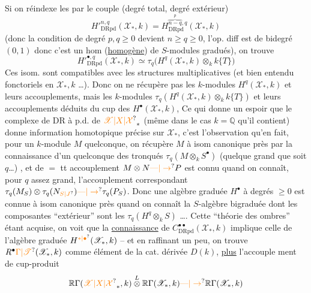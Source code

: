 Si on réindexe les  par le couple (degré total, degré extérieur)
\[
{H'}^{n,q}_{\mathrm{DRpd}}(\mathscr X_{\ast},k)=H^{\overbrace{n-q}^{p},q}_{\mathrm{DRpd}}(\mathscr X_{\ast},k)
\]
(donc la condition de degré $p,q\geq0$ devient $n\geq q\geq 0$, l'op. diff est de bidegré $(0,1)$ donc c'est un hom (\uline{homogène}) de $S$-modules gradués), on trouve
\[
{H'}^{\bullet,q}_{\mathrm{DRpd}}(\mathscr X_\ast,k)\simeq\tau_q\big(H^q(\mathscr X_\ast,k)\otimes_k k\{T\}\big)
\]
Ces isom. sont compatibles avec les structures multiplicatives (et bien entendu fonctoriels en $\mathscr X_{\ast},k$ \ldots). Donc  on ne récupère  pas les $k$-modules $H^q(\mathscr X_{\ast},k)$ et leurs accouplements, mais les $k$-modules  $\tau_q(H^q(\mathscr X_{\ast},k)\otimes_k k\{T\})$ et leurs accouplements déduits du cup des $H^\bullet(\mathscr X_{\ast},k)$,
Ce qui donne un espoir que le complexe de DR à p.d. de $\unsure{\mathscr X|X|\mathcal X}_\ast$  (même dans le cas $k=\mathbb Q$ \unsure{\}|)} qu'il contient) donne  information homotopique précise sur $\mathscr X_\ast$, c'est l'observation qu'en fait, pour un  $k$-module $M$ quelconque, on récupère $M$ à isom canonique près par la connaissance d'un quelconque des tronqués $\tau_q(M\otimes_k S^\bullet)$ (quelque grand que soit $q$\ldots) , et de $=$ tt accouplement $M\otimes N\unsure{\text{---}|\to}P$ est connu quand on connaît, pour $q$ assez grand, l'accouplement correspondant $\tau_q(M_S)\otimes\tau_q(N_{\unsure{S|J}})\unsure{\text{---}|\to}\tau_q(P_S)$. Donc une algèbre graduée $H^\bullet$ à degrés $\geq 0$  est connue à isom canonique près quand on connaît la $S$-algèbre bigraduée dont les composantes  ``extérieur''  sont les $\tau_q(H^q\otimes_k S)$ \ldots.  Cette ``théorie des ombres'' étant  acquise, on voit que la \uline{connaissance} de $C^{\bullet\bullet}_{\mathrm{DRpd}}(\mathscr X_\ast,k)$  implique celle de l'algèbre graduée $H^{\unsure{\ast|\bullet}}(\mathscr X_\ast,k)$ -- et en raffinant un peu, on  trouve  $R^{\bullet}\unsure{\Gamma|\mathscr T}(\mathscr X_\ast,k)$ comme élément de la cat. dérivée $D(k)$, \uline{plus} l'accouple%
%
%
ment de cup-produit
\[
\mathbb R\Gamma(\unsure{\mathscr X|X|\mathcal X}_{\ast},k)\overset{L}{\otimes}\mathbb R\Gamma(\mathscr X_\ast,k)\unsure{\text{---}|\to}\mathbb R\Gamma(\mathscr X_\ast,k)
\]

